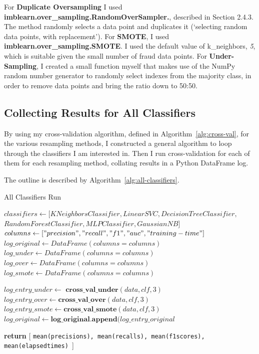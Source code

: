 \documentclass[12pt,a4paper,twoside]{report}
\begin{document}
For \textbf{Duplicate Oversampling} I used \textbf{imblearn.over\_sampling.RandomOverSampler.}, described in Section 2.4.3. The method randomly selects a data point and duplicates it (`selecting random data points, with replacement').
For \textbf{SMOTE}, I used \textbf{imblearn.over\_sampling.SMOTE}. I used the default value of k\_neighbors, {\em 5}, which is suitable given the small number of fraud data points. 
For \textbf{Under-Sampling}, I created a small function myself that makes use of the NumPy random number generator to randomly select indexes from the majority class, in order to remove data points and bring the ratio down to 50:50.

\subsection{Collecting Results for All Classifiers}
By using my cross-validation algorithm, defined in Algorithm~\ref{alg:cross-val}, for the various resampling methods, I constructed a general algorithm to loop through the classifiers I am interested in. Then I run cross-validation for each of them for each resampling method, collating results in a Python DataFrame log. 

The outline is described by Algorithm~\ref{alg:all-classifiers}.

\begin{algorithm}[!hbtp]
\caption{All Classifiers Run }\label{alg:all-classifiers}
\begin{algorithmic}[1]
        \State
         \texttt{\State $classifiers \gets [KNeighborsClassifier, LinearSVC, DecisionTreeClassifier,$\\ $RandomForestClassifier, MLPClassifier, GaussianNB]$}
          \texttt{\State $columns \gets ["precision", "recall", "f1", "auc", "training-time"]$}
         \texttt{\State $log\_original \gets DataFrame(columns = columns)$}
         \texttt{\State $log\_under \gets DataFrame(columns = columns)$}
         \texttt{\State $log\_over \gets DataFrame(columns = columns)$}
         \texttt{\State $log\_smote \gets DataFrame(columns = columns)$}
         

            	\State $log\_entry\_under\gets  \textbf{ cross\_val\_under}(data, clf, 3) $
            	\State $log\_entry\_over \gets \textbf{cross\_val\_over}(data, clf, 3) $
            	\State $log\_entry\_smote \gets \textbf{cross\_val\_smote}(data, clf, 3) $
            	\State $log\_original \gets \textbf{log\_original.append}(log\_entry\_original $
   	\EndFor
   
   \State \textbf{return} [ \texttt{mean(precisions), mean(recalls), mean(f1scores), mean(elapsedtimes) }]
   
\EndProcedure
\end{algorithmic}
\end{algorithm}
\end{document}
